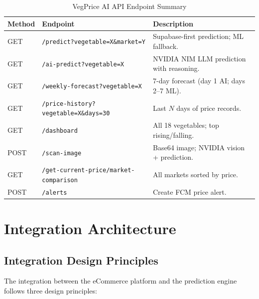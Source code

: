 \documentclass[12pt, a4paper, oneside]{report}
\begin{document}
\begin{table}[H]
\centering
\caption{VegPrice AI API Endpoint Summary}
\label{tab:pred-api}
\begin{tabularx}{\textwidth}{@{} C{1.4cm} L{5.8cm} X @{}}
\toprule
\textbf{Method} & \textbf{Endpoint} & \textbf{Description} \\
\midrule
GET  & \texttt{/predict?vegetable=X\&market=Y}      & Supabase-first prediction; ML fallback. \\
GET  & \texttt{/ai-predict?vegetable=X}             & NVIDIA NIM LLM prediction with reasoning. \\
GET  & \texttt{/weekly-forecast?vegetable=X}        & 7-day forecast (day 1 AI; days 2--7 ML). \\
GET  & \texttt{/price-history?vegetable=X\&days=30} & Last $N$ days of price records. \\
GET  & \texttt{/dashboard}                          & All 18 vegetables; top rising/falling. \\
POST & \texttt{/scan-image}                         & Base64 image; NVIDIA vision + prediction. \\
GET  & \texttt{/get-current-price/market-comparison}& All markets sorted by price. \\
POST & \texttt{/alerts}                             & Create FCM price alert. \\
\bottomrule
\end{tabularx}
\end{table}

\chapter{Integration Architecture}

\section{Integration Design Principles}

The integration between the eCommerce platform and the prediction engine follows
three design principles:
\end{document}
